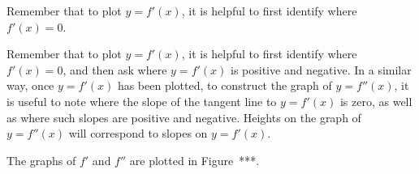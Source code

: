 \begin{smallhint}
Remember that to plot $y = f'(x)$, it is helpful to first identify where $f'(x) = 0.$
\end{smallhint}
\begin{bighint}
Remember that to plot $y = f'(x)$, it is helpful to first identify where $f'(x) = 0$, and then ask where $y = f'(x)$ is positive and negative.  In a similar way, once $y = f'(x)$ has been plotted, to construct the graph of $y=f''(x)$, it is useful to note where the slope of the tangent line to $y = f'(x)$ is zero, as well as where such slopes are positive and negative.  Heights on the graph of $y = f''(x)$ will correspond to slopes on $y = f'(x)$.
\end{bighint}
\begin{activitySolution}
The graphs of $f'$ and $f''$ are plotted in Figure~***.
\end{activitySolution}
\aftera